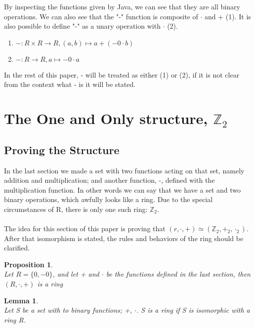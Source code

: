 \documentclass[12pt]{report}
\newtheorem{proposition}{Proposition}[section]
\newtheorem{lemma}{Lemma}[proposition]
\theoremstyle{definition}
\theoremstyle{remark}
\begin{document}
    $\ $\\
    By inspecting the functions given by Java, we can see that they are all binary operations.
    We can also see that the "-" function is composite of $\cdot$ and + (1). It is also possible
    to define "-" as a unary operation with $\cdot$ (2).
    \begin{center}
      \begin{enumerate}
      \item $-: R \times R \rightarrow R, (a,b) \mapsto a+(-0\cdot b)$ \\
      \item $-: R \rightarrow R, a \mapsto -0\cdot a$
      \end{enumerate}
    \end{center}
    In the rest of this paper, - will be treated as either (1) or (2), if it is not clear from the context what - is it will be stated.
  \section{The One and Only structure, $\mathbb{Z}_2$}
    \subsection{Proving the Structure}
    In the last section we made a set with two functions acting on that set, namely addition and multiplication; and another function, -, defined with the multiplication function.
    In other words we can say that we have a set and two binary operations, which awfully looks
    like a ring. Due to the special circumstances of R, there is only one such ring: $\mathbb{Z}_2$.\\
    \\
    The idea for this section of this paper is proving that $(r,\cdot,+)\simeq(\mathbb{Z}_2, +_2, \cdot_2)$. After that isomorphism is stated, the rules and behaviors of the ring should be
    clarified.

    \begin{proposition}$\ $\\
      Let $R=\{0, -0\}$, and let + and $\cdot$ be the functions defined in the last section, then
      $(R,\cdot,+)$ is a ring
    \end{proposition}

    \begin{lemma}$\ $\\
      Let S be a set with to binary functions; +, $\cdot$. S is a ring if S is isomorphic with a ring R.
    \end{lemma}
\end{document}
